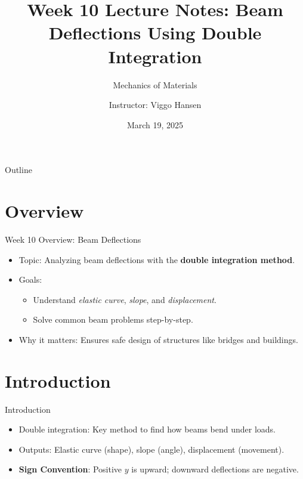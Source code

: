 \documentclass{beamer}
\title{Week 10 Lecture Notes: Beam Deflections Using Double Integration}
\subtitle{Mechanics of Materials}
\author{Instructor: Viggo Hansen}
\date{March 19, 2025}
\begin{document}
\begin{frame}
    \titlepage
\end{frame}

\begin{frame}{Outline}
    \tableofcontents
\end{frame}

\section{Overview}
\begin{frame}{Week 10 Overview: Beam Deflections}
    \begin{itemize}
        \item Topic: Analyzing beam deflections with the \textbf{double integration method}.
        \item Goals:
        \begin{itemize}
            \item Understand \textit{elastic curve}, \textit{slope}, and \textit{displacement}.
            \item Solve common beam problems step-by-step.
        \end{itemize}
        \item Why it matters: Ensures safe design of structures like bridges and buildings.
    \end{itemize}
\end{frame}

\section{Introduction}
\begin{frame}{Introduction}
    \begin{itemize}
        \item Double integration: Key method to find how beams bend under loads.
        \item Outputs: Elastic curve (shape), slope (angle), displacement (movement).
        \item \textbf{Sign Convention}: Positive \( y \) is upward; downward deflections are negative.
    \end{itemize}
\end{frame}

\end{document}
